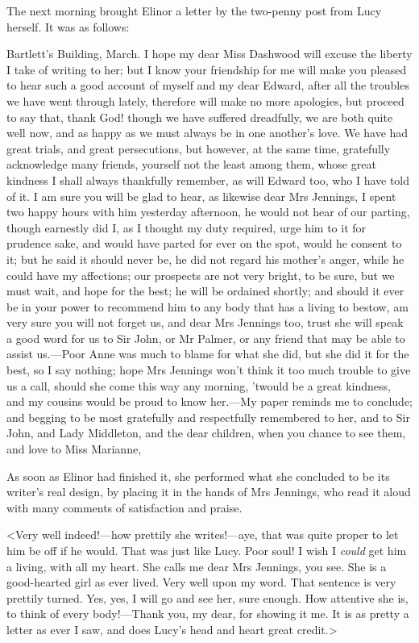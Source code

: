 The next morning brought Elinor a letter by the two-penny post from Lucy herself. It was as follows:

\begin{mail}{Bartlett's Building, March.}{}
I hope my dear Miss Dashwood will excuse the liberty I take of writing to her; but I know your friendship for me will make you pleased to hear such a good account of myself and my dear Edward, after all the troubles we have went through lately, therefore will make no more apologies, but proceed to say that, thank God! though we have suffered dreadfully, we are both quite well now, and as happy as we must always be in one another's love. We have had great trials, and great persecutions, but however, at the same time, gratefully acknowledge many friends, yourself not the least among them, whose great kindness I shall always thankfully remember, as will Edward too, who I have told of it. I am sure you will be glad to hear, as likewise dear Mrs Jennings, I spent two happy hours with him yesterday afternoon, he would not hear of our parting, though earnestly did I, as I thought my duty required, urge him to it for prudence sake, and would have parted for ever on the spot, would he consent to it; but he said it should never be, he did not regard his mother's anger, while he could have my affections; our prospects are not very bright, to be sure, but we must wait, and hope for the best; he will be ordained shortly; and should it ever be in your power to recommend him to any body that has a living to bestow, am very sure you will not forget us, and dear Mrs Jennings too, trust she will speak a good word for us to Sir John, or Mr Palmer, or any friend that may be able to assist us.—Poor Anne was much to blame for what she did, but she did it for the best, so I say nothing; hope Mrs Jennings won't think it too much trouble to give us a call, should she come this way any morning, 'twould be a great kindness, and my cousins would be proud to know her.—My paper reminds me to conclude; and begging to be most gratefully and respectfully remembered to her, and to Sir John, and Lady Middleton, and the dear children, when you chance to see them, and love to Miss Marianne,
\closeletter[I am, \&c.]{}
\end{mail}

As soon as Elinor had finished it, she performed what she concluded to be its writer's real design, by placing it in the hands of Mrs Jennings, who read it aloud with many comments of satisfaction and praise.

<Very well indeed!—how prettily she writes!—aye, that was quite proper to let him be off if he would. That was just like Lucy. Poor soul! I wish I \textit{could} get him a living, with all my heart. She calls me dear Mrs Jennings, you see. She is a good-hearted girl as ever lived. Very well upon my word. That sentence is very prettily turned. Yes, yes, I will go and see her, sure enough. How attentive she is, to think of every body!—Thank you, my dear, for showing it me. It is as pretty a letter as ever I saw, and does Lucy's head and heart great credit.>